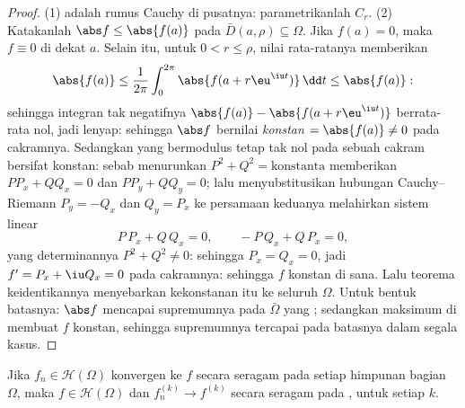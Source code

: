 \begin{proof}
(1) adalah rumus Cauchy di pusatnya: parametrikanlah $C_r$.
(2) Katakanlah $\abs f \leq \abs{f(a)}$ pada $\bar D(a, \rho)
\subseteq \Omega$. Jika $f(a) = 0$, maka $f \equiv 0$ di dekat $a$.
Selain itu, untuk $0 < r \leq \rho$, nilai rata-ratanya memberikan
\[
\abs{f(a)} \leq \frac1{2\pi}\int_0^{2\pi}\abs{f(a +
r\eu^{\iu t})}\,\dd t \leq \abs{f(a)} :
\]
sehingga integran  tak negatifnya $\abs{f(a)} - \abs{f(a +
r\eu^{\iu t})}$ berrata-rata nol, jadi lenyap: sehingga $\abs f$ bernilai
\emph{konstan} $= \abs{f(a)} \ne 0$ pada cakramnya. Sedangkan  yang bermodulus tetap tak nol pada sebuah cakram bersifat konstan:
sebab menurunkan $P^2 + Q^2 = \text{konstanta}$ memberikan $PP_x + QQ_x
= 0$ dan $PP_y + QQ_y = 0$; lalu menyubstitusikan hubungan Cauchy--Riemann
$P_y = -Q_x$ dan $Q_y = P_x$ ke persamaan keduanya
melahirkan sistem linear
\[
P\,P_x + Q\,Q_x = 0, \qquad -P\,Q_x + Q\,P_x = 0,
\]
yang determinannya $P^2 + Q^2 \neq 0$: sehingga $P_x = Q_x = 0$, jadi
$f' = P_x + \iu Q_x = 0$ pada cakramnya: sehingga $f$ konstan di sana. Lalu
teorema keidentikannya menyebarkan kekonstanan itu ke seluruh $\Omega$. Untuk bentuk batasnya: $\abs f$
mencapai supremumnya pada $\bar\Omega$ yang ; sedangkan maksimum
di  membuat $f$ konstan, sehingga supremumnya tercapai pada
batasnya dalam segala kasus.
\end{proof}

\begin{theorem}
\label{thm:b3:holomorphic:weierstrassconv}
Jika $f_n \in \mathcal H(\Omega)$ konvergen ke $f$ secara seragam pada
setiap himpunan bagian  $\Omega$, maka $f \in \mathcal
H(\Omega)$ dan $f_n^{(k)} \to f^{(k)}$ secara seragam pada ,
untuk setiap $k$.
\end{theorem}

